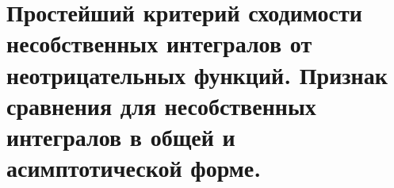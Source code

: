 \documentclass[../main.tex]{subfiles}
\begin{document}
\newpage
\section{Простейший критерий сходимости несобственных интегралов от неотрицательных функций. Признак сравнения для несобственных интегралов в общей и асимптотической форме.}
\end{document}
